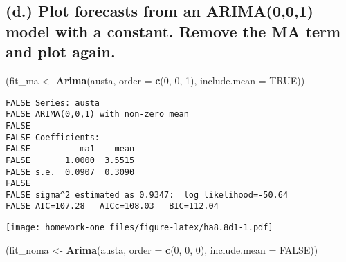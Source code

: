 \documentclass[openany]{book}
\newenvironment{Shaded}{\begin{snugshade}}{\end{snugshade}}
\newcommand{\DataTypeTok}[1]{\textcolor[rgb]{0.13,0.29,0.53}{#1}}
\newcommand{\DecValTok}[1]{\textcolor[rgb]{0.00,0.00,0.81}{#1}}
\newcommand{\KeywordTok}[1]{\textcolor[rgb]{0.13,0.29,0.53}{\textbf{#1}}}
\newcommand{\NormalTok}[1]{#1}
\newcommand{\OperatorTok}[1]{\textcolor[rgb]{0.81,0.36,0.00}{\textbf{#1}}}
\newcommand{\OtherTok}[1]{\textcolor[rgb]{0.56,0.35,0.01}{#1}}
\newcommand{\StringTok}[1]{\textcolor[rgb]{0.31,0.60,0.02}{#1}}
\begin{document}
\hypertarget{d.-plot-forecasts-from-an-arima001-model-with-a-constant.-remove-the-ma-term-and-plot-again.}{%
\subsection{(d.) Plot forecasts from an ARIMA(0,0,1) model with a constant. Remove the MA term and plot again.}\label{d.-plot-forecasts-from-an-arima001-model-with-a-constant.-remove-the-ma-term-and-plot-again.}}

\begin{Shaded}
\begin{Highlighting}[]
\NormalTok{(fit_ma <-}\StringTok{ }\KeywordTok{Arima}\NormalTok{(austa, }\DataTypeTok{order =} \KeywordTok{c}\NormalTok{(}\DecValTok{0}\NormalTok{, }\DecValTok{0}\NormalTok{, }\DecValTok{1}\NormalTok{), }\DataTypeTok{include.mean =} \OtherTok{TRUE}\NormalTok{))}
\end{Highlighting}
\end{Shaded}

\begin{verbatim}
FALSE Series: austa 
FALSE ARIMA(0,0,1) with non-zero mean 
FALSE 
FALSE Coefficients:
FALSE          ma1    mean
FALSE       1.0000  3.5515
FALSE s.e.  0.0907  0.3090
FALSE 
FALSE sigma^2 estimated as 0.9347:  log likelihood=-50.64
FALSE AIC=107.28   AICc=108.03   BIC=112.04
\end{verbatim}

\begin{Shaded}
\end{Shaded}

\texttt{[image: homework-one\_files/figure-latex/ha8.8d1-1.pdf]}

\begin{Shaded}
\begin{Highlighting}[]
\NormalTok{(fit_noma <-}\StringTok{ }\KeywordTok{Arima}\NormalTok{(austa, }\DataTypeTok{order =} \KeywordTok{c}\NormalTok{(}\DecValTok{0}\NormalTok{, }\DecValTok{0}\NormalTok{, }\DecValTok{0}\NormalTok{), }\DataTypeTok{include.mean =} \OtherTok{FALSE}\NormalTok{))}
\end{Highlighting}
\end{Shaded}
\end{document}
